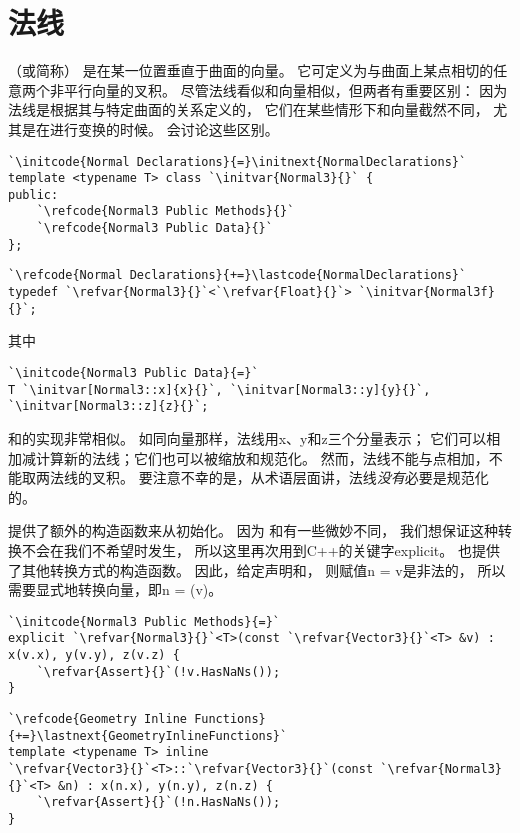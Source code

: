 \section{法线}\label{sec:法线}

（或简称）
是在某一位置垂直于曲面的向量。
它可定义为与曲面上某点相切的任意两个非平行向量的叉积。
尽管法线看似和向量相似，但两者有重要区别：
因为法线是根据其与特定曲面的关系定义的，
它们在某些情形下和向量截然不同，
尤其是在进行变换的时候。
会讨论这些区别。
\begin{lstlisting}
`\initcode{Normal Declarations}{=}\initnext{NormalDeclarations}`
template <typename T> class `\initvar{Normal3}{}` {
public:
    `\refcode{Normal3 Public Methods}{}`
    `\refcode{Normal3 Public Data}{}`
};
\end{lstlisting}
\begin{lstlisting}
`\refcode{Normal Declarations}{+=}\lastcode{NormalDeclarations}`
typedef `\refvar{Normal3}{}`<`\refvar{Float}{}`> `\initvar{Normal3f}{}`;
\end{lstlisting}
其中
\begin{lstlisting}
`\initcode{Normal3 Public Data}{=}`
T `\initvar[Normal3::x]{x}{}`, `\initvar[Normal3::y]{y}{}`, `\initvar[Normal3::z]{z}{}`;
\end{lstlisting}

和的实现非常相似。
如同向量那样，法线用{\ttfamily x}、{\ttfamily y}和{\ttfamily z}三个分量表示；
它们可以相加减计算新的法线；它们也可以被缩放和规范化。
然而，法线不能与点相加，不能取两法线的叉积。
要注意不幸的是，从术语层面讲，法线\emph{没有}必要是规范化的。

提供了额外的构造函数来从初始化。
因为
和有一些微妙不同，
我们想保证这种转换不会在我们不希望时发生，
所以这里再次用到C++的关键字{\ttfamily explicit}。
也提供了其他转换方式的构造函数。
因此，给定声明和，
则赋值{\ttfamily n = v}是非法的，
所以需要显式地转换向量，即{\ttfamily n = (v)}。
\begin{lstlisting}
`\initcode{Normal3 Public Methods}{=}`
explicit `\refvar{Normal3}{}`<T>(const `\refvar{Vector3}{}`<T> &v) : x(v.x), y(v.y), z(v.z) {
    `\refvar{Assert}{}`(!v.HasNaNs());
}
\end{lstlisting}
\begin{lstlisting}
`\refcode{Geometry Inline Functions}{+=}\lastnext{GeometryInlineFunctions}`
template <typename T> inline
`\refvar{Vector3}{}`<T>::`\refvar{Vector3}{}`(const `\refvar{Normal3}{}`<T> &n) : x(n.x), y(n.y), z(n.z) {
    `\refvar{Assert}{}`(!n.HasNaNs());
}
\end{lstlisting}

